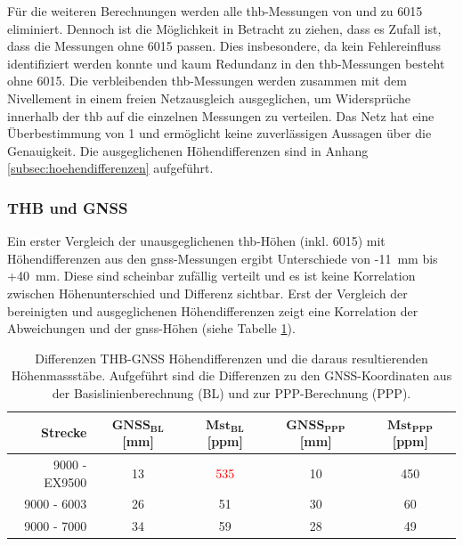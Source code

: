 Für die weiteren Berechnungen werden alle \acrshort{thb}-Messungen von und zu 6015 eliminiert. Dennoch ist die Möglichkeit in Betracht zu ziehen, 
dass es Zufall ist, dass die Messungen ohne 6015 passen. Dies insbesondere, da kein Fehlereinfluss identifiziert werden konnte und 
kaum Redundanz in den \acrshort{thb}-Messungen besteht ohne 6015. Die verbleibenden \acrshort{thb}-Messungen werden zusammen mit dem Nivellement in einem 
freien Netzausgleich ausgeglichen, um Widersprüche innerhalb der \gls{thb} auf die einzelnen Messungen zu verteilen. Das Netz hat eine 
Überbestimmung von 1 und ermöglicht keine zuverlässigen Aussagen über die Genauigkeit. Die ausgeglichenen Höhendifferenzen sind in 
Anhang \ref{subsec:hoehendifferenzen} aufgeführt.

\subsubsection{THB und GNSS}
\label{sec:thb-und-gnss}
Ein erster Vergleich der unausgeglichenen \acrshort{thb}-Höhen (inkl. 6015) mit Höhendifferenzen aus den \acrshort{gnss}-Messungen ergibt 
Unterschiede von -11~mm bis +40~mm. Diese sind scheinbar zufällig verteilt und es ist keine Korrelation zwischen 
Höhenunterschied und Differenz sichtbar.
Erst der Vergleich der bereinigten und ausgeglichenen Höhendifferenzen zeigt eine Korrelation der Abweichungen 
und der \acrshort{gnss}-Höhen (siehe Tabelle \ref{tab:THB_GNSS}).

\begin{table}[h]
    \centering
    \caption{Differenzen THB-GNSS Höhendifferenzen und die daraus resultierenden Höhenmassstäbe. Aufgeführt sind die Differenzen zu den 
    GNSS-Koordinaten aus der Basislinienberechnung (BL) und zur PPP-Berechnung (PPP).}
    \label{tab:THB_GNSS}
    \begin{tabular}{rcccc}
        \toprule
        \textbf{Strecke} & $\mathbf{GNSS_{BL}}$\textbf{[mm]} & $\mathbf{Mst_{BL}}$ \textbf{[ppm]} & $\mathbf{GNSS_{PPP}}$\textbf{[mm]} & $\mathbf{Mst_{PPP}}$ \textbf{[ppm]}\\
        \midrule
        9000 - EX9500 & 13 & \textcolor{red}{535} & 10 & 450 \\
        \rowcolor{lightgray}
        9000 - 6003 & 26 & 51 & 30 & 60 \\
        9000 - 7000 & 34 & 59 & 28 & 49 \\
        \bottomrule
    \end{tabular}
\end{table} 

